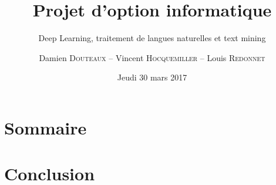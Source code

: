 \documentclass{beamer}
\title{Projet d'option informatique}
\subtitle{Deep Learning, traitement de langues naturelles et text mining}
\author{Damien \textsc{Douteaux} -- Vincent \textsc{Hocquemiller} -- Louis \textsc{Redonnet}}
\date{Jeudi 30 mars 2017}
\begin{document}
\begin{frame}[plain]
	\titlepage
\end{frame}

\section{Sommaire}


\section{Conclusion}

\end{document}
